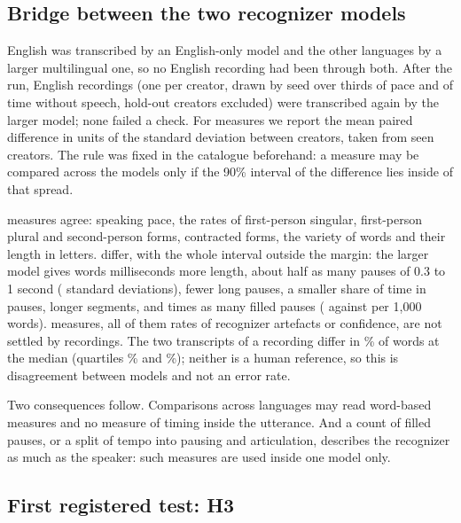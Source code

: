 \documentclass[letterpaper]{article} %
\begin{document}
\subsection{Bridge between the two recognizer models}
\label{sec:bridge}

English was transcribed by an English-only model and the other languages by a larger multilingual one, so no English recording had been through both. After the run, \BridgePairs{} English recordings (one per creator, drawn by seed over thirds of pace and of time without speech, hold-out creators excluded) were transcribed again by the larger model; none failed a check. For \BridgeMeasures{} measures we report the mean paired difference in units of the standard deviation between creators, taken from \BridgeSpreadCreators{} seen creators. The rule was fixed in the catalogue beforehand: a measure may be compared across the models only if the 90\% interval of the difference lies inside \BridgeMargin{} of that spread.

\BridgeAgree{} measures agree: speaking pace, the rates of first-person singular, first-person plural and second-person forms, contracted forms, the variety of words and their length in letters. \BridgeDiffer{} differ, with the whole interval outside the margin: the larger model gives words \BridgeWordMs{} milliseconds more length, about half as many pauses of 0.3 to 1 second (\BridgeShortPauseSd{} standard deviations), fewer long pauses, a smaller share of time in pauses, longer segments, and \BridgeFillerRatio{} times as many filled pauses (\BridgeFillerLarge{} against \BridgeFillerSmall{} per 1{,}000 words). \BridgeOpen{} measures, all of them rates of recognizer artefacts or confidence, are not settled by \BridgePairs{} recordings. The two transcripts of a recording differ in \BridgeDisagreeMedian\% of words at the median (quartiles \BridgeDisagreeLow\% and \BridgeDisagreeHigh\%); neither is a human reference, so this is disagreement between models and not an error rate.

Two consequences follow. Comparisons across languages may read word-based measures and no measure of timing inside the utterance. And a count of filled pauses, or a split of tempo into pausing and articulation, describes the recognizer as much as the speaker: such measures are used inside one model only.

\subsection{First registered test: H3}
\label{sec:hthree}
\end{document}
